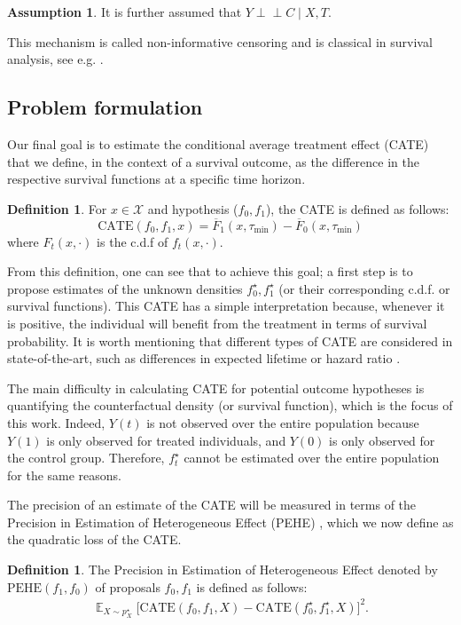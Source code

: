 \documentclass[12pt]{article}
\theoremstyle{plain}
\theoremstyle{definition}
\newtheorem{definition}[theorem]{Definition}
\newtheorem{assumption}[theorem]{Assumption}
\theoremstyle{remark}
\DeclareMathOperator{\E}{\mathbb{E}}
\newcommand\independent{\perp \!\!\! \perp }
\begin{document}
\begin{assumption}\label{ass:indep}
It is further assumed that $Y \independent  C \mid X,T$.
\end{assumption}
 This mechanism is called non-informative censoring \cite{Cole2004AdjustedSC,Daz2019StatisticalIF} and is classical in survival analysis, see e.g. \cite{klein2003survival}. 

\subsection{Problem formulation}\label{sec:problemform}

Our final goal is to estimate the conditional average treatment effect (CATE) that we define, in the context of a survival outcome, as the difference in the respective survival functions at a specific time horizon.   
\begin{definition}\label{def:CATE}
For  $x\in \mathcal{X}$ and hypothesis ($f_{0},f_{1}$), the CATE is defined as follows:
\begin{equation*}
\text{CATE}(f_{0},f_{1},x) = \overline{F}_{1}( x,\tau_{\min} ) -\overline{F}_{0}( x,\tau_{\min} )
\end{equation*}
where $F_{t}( x,\cdot )$ is the c.d.f of $f_t(x,\cdot)$.
\end{definition}
From this definition, one can see that to achieve this goal; a first step is to propose estimates of the unknown densities $f_{0}^{\star},f_{1}^{\star}$ (or their corresponding c.d.f. or survival functions). This CATE has a simple interpretation because, whenever it is positive, the individual will benefit from the treatment in terms of survival probability. It is worth mentioning that different types of CATE  are considered in state-of-the-art, such as differences in expected lifetime or hazard ratio \cite{chapfuwa2020survival}.


The main difficulty in calculating CATE for potential outcome hypotheses is quantifying the counterfactual density (or survival function), which is the focus of this work. Indeed, $Y(t)$ is not observed over the entire population because $Y(1)$ is only observed for treated individuals, and $Y(0)$ is only observed for the control group. Therefore, $f_t^{\star}$ cannot be estimated over the entire population for the same reasons.


The precision of an estimate of the CATE will be measured in terms of the Precision in Estimation of Heterogeneous Effect (PEHE) \cite{Hill2011BayesianInference}, which we now define as the quadratic loss of the CATE.
\begin{definition}
The Precision in Estimation of Heterogeneous Effect denoted by $\text{PEHE}(f_1,f_0) $ of proposals $f_0,f_1$ is defined as follows:
\begin{align*}
\E_{X\sim p^\star_{X}} \Big[\text{CATE}( f_{0} ,f_{1} ,X)  -\text{CATE}( f^{\star}_{0} ,f^{\star}_{1} , X) \Big]^2.
\end{align*}
\end{definition}
\end{document}
